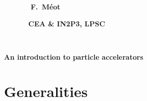 \documentclass[12pt]{article}
\begin{document}
\sffamily


{
 ~~~~~~~ \hfill \large   \bf F.~M\'eot 

~~~~~~~\hfill \large   \bf CEA \& IN2P3, LPSC
}

~~~~~~~~~~~~~~~~~~~~~~~~~

\vspace{-10mm}

\begin{center} 
{\Huge  
\bf  An introduction to particle accelerators
}
\end{center} 

\tableofcontents





\clearpage

\section{\LARGE Generalities }
\end{document}
